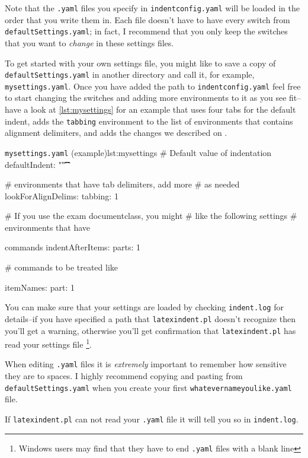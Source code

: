\documentclass[11pt]{article}
\begin{document}
Note that the \lstinline!.yaml! files you specify in \lstinline!indentconfig.yaml!
will be loaded in the order that you write them in. Each file doesn't have
to have every switch from \lstinline!defaultSettings.yaml!; in fact, I recommend
that you only keep the switches that you want to \emph{change} in these
settings files.

To get started with your own settings file, you might like to save a copy of
\lstinline!defaultSettings.yaml! in another directory and call it, for
example, \lstinline!mysettings.yaml!. Once you have added the path to \lstinline!indentconfig.yaml!
feel free to start changing the switches and adding more environments to it
as you see fit--have a look at \cref{lst:mysettings} for an example
that uses four tabs for the default indent, adds the \lstinline!tabbing!
environment to the list of environments that contains alignment delimiters, 
and adds the changes we described on .

\begin{cmhlistings}[style=yaml]{\lstinline!mysettings.yaml! (example)}{lst:mysettings}
# Default value of indentation
defaultIndent: "\t\t\t\t"

# environments that have tab delimiters, add more
# as needed
lookForAlignDelims:
   tabbing: 1

# If you use the exam documentclass, you might 
# like the following settings
# environments that have \item commands
indentAfterItems:
    parts: 1

# commands to be treated like \item
itemNames:
    part: 1
\end{cmhlistings}

You can make sure that your settings are loaded by checking \lstinline!indent.log!
for details--if you have specified a path that \lstinline!latexindent.pl! doesn't
recognize then you'll get a warning, otherwise you'll get confirmation that
\lstinline!latexindent.pl! has read your settings file \footnote{Windows users
	may find that they have to end \lstinline!.yaml! files with a blank line}.

\begin{warning}
	When editing \lstinline!.yaml! files it is \emph{extremely} important
	to remember how sensitive they are to spaces. I highly recommend copying
	and pasting from \lstinline!defaultSettings.yaml! when you create your
	first \lstinline!whatevernameyoulike.yaml! file.

	If \lstinline!latexindent.pl! can not read your \lstinline!.yaml! file it
	will tell you so in \lstinline!indent.log!.
\end{warning}
\end{document}
